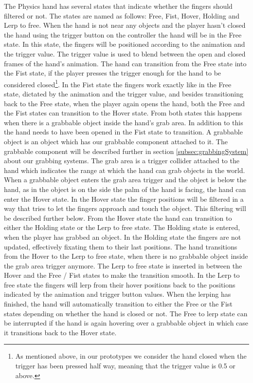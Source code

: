 The Physics hand has several states that indicate whether the fingers should filtered or not. The states are named as follows: Free, Fist, Hover, Holding and Lerp to free. When the hand is not near any objects and the player hasn't closed the hand using the trigger button on the controller the hand will be in the Free state. In this state, the fingers will be positioned according to the animation and the trigger value. The trigger value is used to blend between the open and closed frames of the hand's animation. The hand can transition from the Free state into the Fist state, if the player presses the trigger enough for the hand to be considered closed\footnote{As mentioned above, in our prototypes we consider the hand closed when the trigger has been pressed half way, meaning that the trigger value is 0.5 or above.}. In the Fist state the fingers work exactly like in the Free state, dictated by the animation and the trigger value, and besides transitioning back to the Free state, when the player again opens the hand, both the Free and the Fist states can transition to the Hover state. From both states this happens when there is a grabbable object inside the hand's grab area. In addition to this the hand needs to have been opened in the Fist state to transition. A grabbable object is an object which has our grabbable component attached to it. The grabbable component will be described further in section \ref{subsec:grabbingSystem} about our grabbing systems. The grab area is a trigger collider attached to the hand which indicates the range at which the hand can grab objects in the world. When a grabbable object enters the grab area trigger and the object is below the hand, as in the object is on the side the palm of the hand is facing, the hand can enter the Hover state. In the Hover state the finger positions will be filtered in a way that tries to let the fingers approach and touch the object. This filtering will be described further below. From the Hover state the hand can transition to either the Holding state or the Lerp to free state. The Holding state is entered, when the player has grabbed an object. In the Holding state the fingers are not updated, effectively fixating them to their last positions. The hand transitions from the Hover to the Lerp to free state, when there is no grabbable object inside the grab area trigger anymore. The Lerp to free state is inserted in between the Hover and the Free / Fist states to make the transition smooth. In the Lerp to free state the fingers will lerp from their hover positions back to the positions indicated by the animation and trigger button values. When the lerping has finished, the hand will automatically transition to either the Free or the Fist states depending on whether the hand is closed or not. The Free to lerp state can be interrupted if the hand is again hovering over a grabbable object in which case it transitions back to the Hover state.

